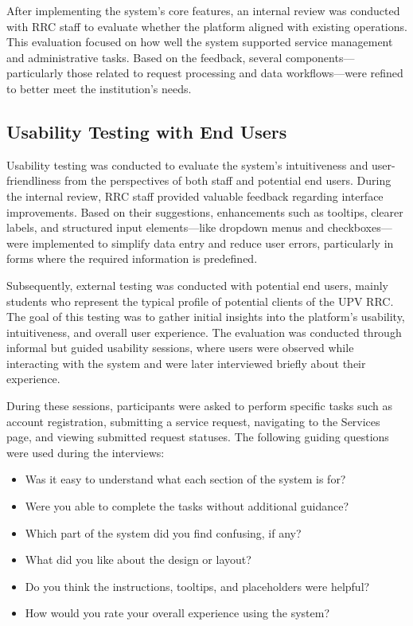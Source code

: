 After implementing the system's core features, an internal review was conducted with RRC staff to evaluate whether the platform aligned with existing operations. This evaluation focused on how well the system supported service management and administrative tasks. Based on the feedback, several components—particularly those related to request processing and data workflows—were refined to better meet the institution’s needs.

\subsection{Usability Testing with End Users}

Usability testing was conducted to evaluate the system’s intuitiveness and user-friendliness from the perspectives of both staff and potential end users. During the internal review, RRC staff provided valuable feedback regarding interface improvements. Based on their suggestions, enhancements such as tooltips, clearer labels, and structured input elements—like dropdown menus and checkboxes—were implemented to simplify data entry and reduce user errors, particularly in forms where the required information is predefined.

Subsequently, external testing was conducted with potential end users, mainly students who represent the typical profile of potential clients of the UPV RRC. The goal of this testing was to gather initial insights into the platform's usability, intuitiveness, and overall user experience. The evaluation was conducted through informal but guided usability sessions, where users were observed while interacting with the system and were later interviewed briefly about their experience.

During these sessions, participants were asked to perform specific tasks such as account registration, submitting a service request, navigating to the Services page, and viewing submitted request statuses. The following guiding questions were used during the interviews:

\begin{itemize}
	\item Was it easy to understand what each section of the system is for?
	\item Were you able to complete the tasks without additional guidance?
	\item Which part of the system did you find confusing, if any?
	\item What did you like about the design or layout?
	\item Do you think the instructions, tooltips, and placeholders were helpful?
	\item How would you rate your overall experience using the system?
\end{itemize}


